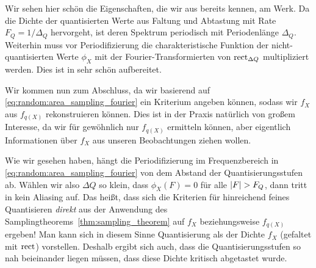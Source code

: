 Wir sehen hier schön die Eigenschaften, die wir aus  bereits kennen, am Werk.
Da die Dichte der quantisierten Werte aus Faltung und Abtastung mit Rate $F_Q = 1/\Delta_Q$ hervorgeht, ist deren Spektrum periodisch mit Periodenlänge $\Delta_Q$. 
Weiterhin muss vor Periodifizierung die charakteristische Funktion der nicht-quantisierten Werte $\phi_X$ mit der Fourier-Transformierten von $\operatorname{rect}_{\Delta Q}$ multipliziert werden.
Dies ist in  sehr schön aufbereitet.

Wir kommen nun zum Abschluss, da wir basierend auf \eqref{eq:random:area_sampling_fourier} ein Kriterium angeben können, sodass wir $f_X$ aus $f_{q(X)}$ rekonstruieren können. 
Dies ist in der Praxis natürlich von großem Interesse, da wir für gewöhnlich nur $f_{q(X)}$ ermitteln können, aber eigentlich Informationen über $f_X$ aus unseren Beobachtungen ziehen wollen.

Wie wir gesehen haben, hängt die Periodifizierung im Frequenzbereich in \eqref{eq:random:area_sampling_fourier} von dem Abstand der Quantisierungsstufen ab.
Wählen wir also $\Delta Q$ so klein, dass $\phi_X(F) = 0$ für alle ${\left| F \right|} > F_Q$, dann tritt in  kein Aliasing auf.
Das heißt, dass sich die Kriterien für hinreichend feines Quantisieren \emph{direkt} aus der Anwendung des Samplingtheorems~\ref{thm:sampling_theorem} auf $f_{X}$ beziehungsweise $f_{q(X)}$ ergeben!
Man kann sich in diesem Sinne Quantisierung als  der Dichte $f_X$ (gefaltet mit $\operatorname{rect}$) vorstellen.
Deshalb ergibt sich auch, dass die Quantisierungsstufen so nah beieinander liegen müssen, dass diese Dichte kritisch abgetastet wurde.

